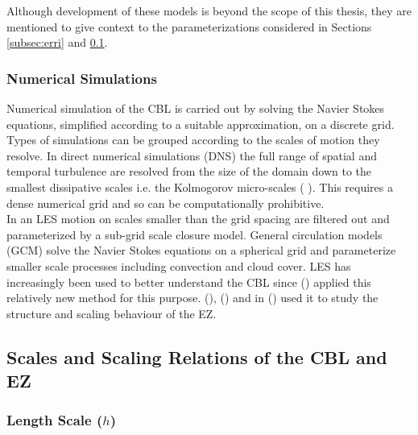 Although development of these models is beyond the scope of this thesis, they are mentioned to give context to the parameterizations considered in Sections \ref{subsec:erri} and \ref{subsec:scales}. \\         

\subsubsection{Numerical Simulations}
\label{subsec:}

Numerical simulation of the \acs{CBL} is carried out by solving the Navier Stokes equations, simplified according to a suitable approximation, on a discrete grid.  Types of simulations can be grouped according to the scales of motion they resolve.  In direct numerical simulations (\acs{DNS}) the full range of spatial and temporal turbulence are resolved from the size of the domain down to the smallest dissipative scales i.e. the Kolmogorov micro-scales (\citeauthor{Kolmog} \citeyear{Kolmog}).  This requires a dense numerical grid and so can be computationally prohibitive.\\

In an \acs{LES} motion on scales smaller than the grid spacing are filtered out and parameterized by a sub-grid scale closure model. General circulation models (\acs{GCM}) solve the Navier Stokes equations on a spherical grid and parameterize smaller scale processes including convection and cloud cover.  \acs{LES} has increasingly been used to better understand the \acs{CBL} since \citeauthor{Deardorff72} (\citeyear{Deardorff72}) applied this relatively new method for this purpose.  \citeauthor{SullMoengStev} (\citeyear{SullMoengStev}), \citeauthor{FedConzMir04} (\citeyear{FedConzMir04}) and \citeauthor{BrooksFowler2} in (\citeyear{BrooksFowler2}) used it to study the structure and scaling behaviour of the \acs{EZ}.\\

\subsection{Scales and Scaling Relations of the \acs{CBL} and \acs{EZ}}
\label{subsec:scales}

\subsubsection{Length Scale ($h$)}
\label{subsubsec:}

